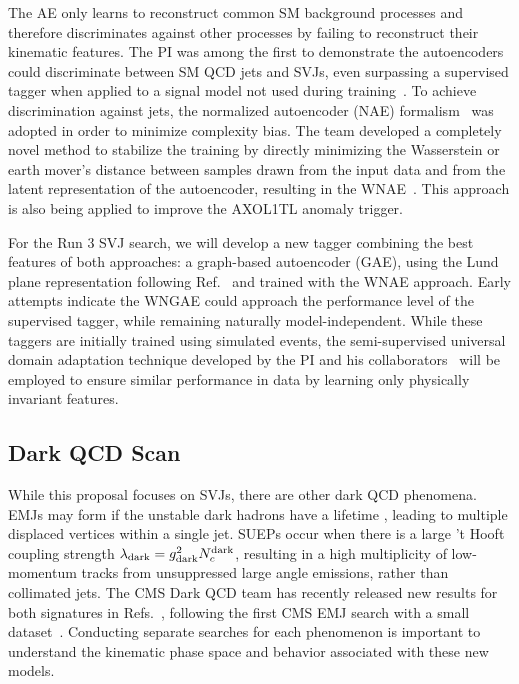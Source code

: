 The AE only learns to reconstruct common SM background processes and therefore discriminates against other processes by failing to reconstruct their kinematic features.
The PI was among the first to demonstrate the autoencoders could discriminate between SM QCD jets and SVJs, even surpassing a supervised tagger when applied to a signal model not used during training~\cite{Canelli:2021aps}.
To achieve discrimination against \ttbar jets, the normalized autoencoder (NAE) formalism~\cite{Dillon:2022mkq} was adopted in order to minimize complexity bias.
The team developed a completely novel method to stabilize the training by directly minimizing the Wasserstein or earth mover's distance
between samples drawn from the input data and from the latent representation of the autoencoder, resulting in the WNAE~\cite{Eble:2024tpr}.
This approach is also being applied to improve the AXOL1TL anomaly trigger.

For the Run 3 SVJ search, we will develop a new tagger combining the best features of both approaches:
a graph-based autoencoder (GAE), using the Lund plane representation following Ref.~\cite{Dreyer:2020brq} and trained with the WNAE approach.
Early attempts indicate the WNGAE could approach the performance level of the supervised tagger, while remaining naturally model-independent.
While these taggers are initially trained using simulated events,
the semi-supervised universal domain adaptation technique developed by the PI and his collaborators~\cite{Ciprijanovic:2023hrw}
will be employed to ensure similar performance in data by learning only physically invariant features.

\subsection{Dark QCD Scan}\label{subsec:darkscan}

While this proposal focuses on SVJs, there are other dark QCD phenomena.
EMJs may form if the unstable dark hadrons have a lifetime \taudark, leading to multiple displaced vertices within a single jet.
SUEPs occur when there is a large 't Hooft coupling strength $\lambda_\text{dark} = g_{\mathrm{dark}}^2 N_{c}^{\text{dark}}$,
resulting in a high multiplicity of low-momentum tracks from unsuppressed large angle emissions, rather than collimated jets.
The CMS Dark QCD team has recently released new results for both signatures in Refs.~\cite{CMS:2023vpb,CMS:2024emj},
following the first CMS EMJ search with a small dataset~\cite{Sirunyan:2018njd}.
Conducting separate searches for each phenomenon is important to understand the kinematic phase space and behavior associated with these new models.

